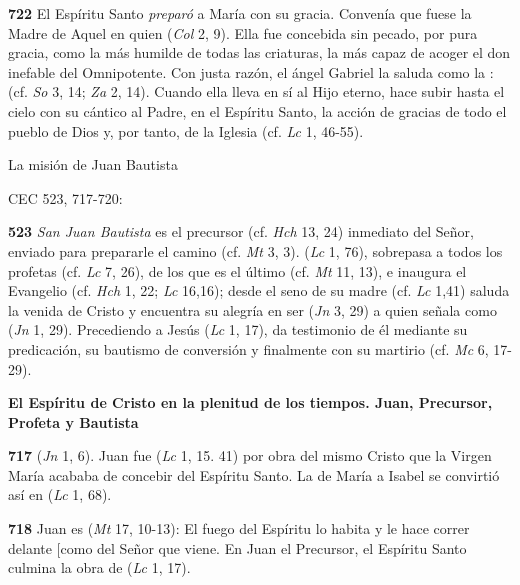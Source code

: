 \begin{body}
\begin{body}
\textbf{722} El Espíritu Santo \emph{preparó} a María con su gracia. Convenía que fuese  la Madre de Aquel en quien  (\emph{Col} 2, 9). Ella fue concebida sin pecado, por pura gracia, como la más humilde de todas las criaturas, la más capaz de acoger el don inefable del Omnipotente. Con justa razón, el ángel Gabriel la saluda como la :  (cf. \emph{So} 3, 14; \emph{Za} 2, 14). Cuando ella lleva en sí al Hijo eterno, hace subir hasta el cielo con su cántico al Padre, en el Espíritu Santo, la acción de gracias de todo el pueblo de Dios y, por tanto, de la Iglesia (cf. \emph{Lc} 1, 46-55).

La misión de Juan Bautista

CEC 523, 717-720:

\textbf{523} \emph{San Juan Bautista} es el precursor (cf. \emph{Hch} 13, 24) inmediato del Señor, enviado para prepararle el camino (cf. \emph{Mt} 3, 3).  (\emph{Lc} 1, 76), sobrepasa a todos los profetas (cf. \emph{Lc} 7, 26), de los que es el último (cf. \emph{Mt} 11, 13), e inaugura el Evangelio (cf. \emph{Hch} 1, 22; \emph{Lc} 16,16); desde el seno de su madre (cf. \emph{Lc} 1,41) saluda la venida de Cristo y encuentra su alegría en ser  (\emph{Jn} 3, 29) a quien señala como  (\emph{Jn} 1, 29). Precediendo a Jesús  (\emph{Lc} 1, 17), da testimonio de él mediante su predicación, su bautismo de conversión y finalmente con su martirio (cf. \emph{Mc} 6, 17-29).

\textbf{El Espíritu de Cristo en la plenitud de los tiempos. Juan, Precursor, Profeta y Bautista}

\textbf{717}  (\emph{Jn} 1, 6). Juan fue  (\emph{Lc} 1, 15. 41) por obra del mismo Cristo que la Virgen María acababa de concebir del Espíritu Santo. La  de María a Isabel se convirtió así en  (\emph{Lc} 1, 68).

\textbf{718} Juan es  (\emph{Mt} 17, 10-13): El fuego del Espíritu lo habita y le hace correr delante {[}como \textquote{precursor}{]} del Señor que viene. En Juan el Precursor, el Espíritu Santo culmina la obra de  (\emph{Lc} 1, 17).


\end{body}
\end{body}
